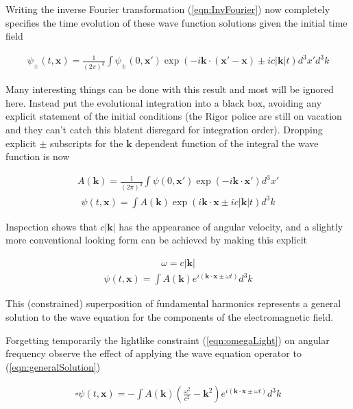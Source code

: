\documentclass[]{eliblog}
\newcommand{\Abs}[1]{{\left\lvert{#1}\right\rvert}}
\newcommand{\Bk}[0]{\mathbf{k}}
\newcommand{\Bx}[0]{\mathbf{x}}
\newcommand{\delambertian}[0]{\square}
\newcommand{\inv}[1]{\frac{1}{#1}}
\begin{document}
Writing the inverse Fourier transformation (\ref{eqn:InvFourier}) now
completely specifies the time evolution of these wave function solutions given the initial time field

\begin{align}
{\psi}_{\pm}(t,\Bx) 
= \inv{({2\pi})^3} \int \psi_{\pm}(0,\Bx') \exp\left( -i \Bk \cdot (\Bx' -\Bx) \pm i c \Abs{\Bk} t \right) d^3 x' d^3 k
\end{align}

Many interesting things can be done with this result and most will be ignored here.  Instead put the evolutional integration into a black box, avoiding any explicit statement of the initial conditions (the Rigor police are still on vacation and they can't catch this blatent
disregard for integration order).  Dropping explicit $\pm$ subscripts for the $\Bk$ dependent function of the integral the wave 
function is now

\begin{align}
A(\Bk) = \inv{({2\pi})^3} \int \psi(0,\Bx') \exp\left( -i \Bk \cdot \Bx' \right) d^3 x'
\end{align}
\begin{align}\label{eqn:wavefunction}
{\psi}(t,\Bx) = \int A(\Bk) \exp\left( i \Bk \cdot \Bx \pm i c \Abs{\Bk} t \right) d^3 k
\end{align}

Inspection shows that $c \Abs{\Bk}$ has the appearance of angular velocity, and a slightly more 
conventional looking form can be achieved by making this explicit

\begin{align}\label{eqn:omegaLight}
\omega = c \Abs{\Bk}
\end{align}
\begin{align}\label{eqn:generalSolution}
{\psi}(t,\Bx) = \int A(\Bk) e^{ i (\Bk \cdot \Bx \pm \omega t) } d^3 k
\end{align}

This (constrained) superposition of fundamental harmonics represents a general solution to the wave equation for the components 
of the electromagnetic field.

Forgetting temporarily the lightlike constraint (\ref{eqn:omegaLight}) on angular frequency observe the effect of applying the wave equation operator to 
(\ref{eqn:generalSolution})

\begin{align}\label{eqn:matterWaveTemp}
\delambertian {\psi}(t,\Bx) = -\int A(\Bk) \left( \frac{\omega^2}{c^2} - \Bk^2 \right) e^{ i (\Bk \cdot \Bx \pm \omega t) } d^3 k
\end{align}
 
\end{document}
